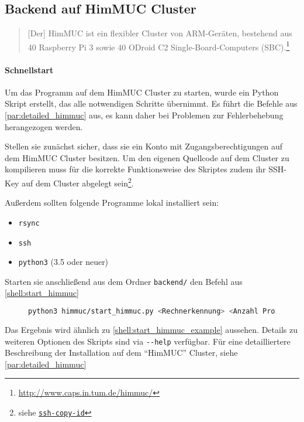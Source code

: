 \subsection{Backend auf HimMUC Cluster}

\begin{quotation}
	[Der] HimMUC ist ein flexibler Cluster von ARM-Geräten, bestehend aus 40 Raspberry Pi 3 sowie 40 ODroid C2 Single-Board-Computers (SBC).\footnote{\url{http://www.caps.in.tum.de/himmuc/}}
\end{quotation}

\paragraph{Schnellstart}

Um das Programm auf dem HimMUC Cluster zu starten, wurde ein
Python Skript erstellt, das alle notwendigen Schritte übernimmt.
Es führt die Befehle aus \autoref{par:detailed_himmuc} aus, es kann daher bei Problemen zur Fehlerbehebung herangezogen werden.

Stellen sie zunächst sicher, dass sie ein Konto mit Zugangsberechtigungen auf dem HimMUC Cluster besitzen.
Um den eigenen Quellcode auf dem Cluster zu kompilieren muss für die korrekte Funktionsweise des Skriptes zudem
ihr SSH-Key auf dem Cluster abgelegt sein\footnote{siehe \href{https://www.ssh.com/ssh/copy-id}{\texttt{ssh-copy-id}}}.

Außerdem sollten folgende Programme lokal installiert sein:
\begin{itemize}
	\item \verb|rsync|
	\item \verb|ssh|
	\item \verb|python3| (3.5 oder neuer)
\end{itemize}

Starten sie anschließend aus dem Ordner \verb|backend/| den Befehl aus \autoref{shell:start_himmuc}

\begin{figure}[h!]
	\begin{lstlisting}[language=bash, caption={Start der Entwicklungsumbegung auf dem HimMUC}, label={shell:start_himmuc}]
python3 himmuc/start_himmuc.py <Rechnerkennung> <Anzahl Prozesse> <Anzahl Rechenknoten> 
    \end{lstlisting}
\end{figure}

Das Ergebnis wird ähnlich zu \autoref{shell:start_himmuc_example} aussehen.
Details zu weiteren Optionen des Skripts sind via \verb|--help| verfügbar.
Für eine detailliertere Beschreibung der Installation auf dem \enquote{HimMUC} Cluster,
siehe \autoref{par:detailed_himmuc}

